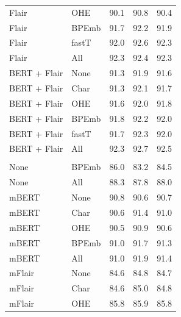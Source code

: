 \documentclass[12pt,a4paper,]{book}
\begin{document}
\begin{longtable}[t]{llrrr}
\hspace{1em}Flair & OHE & 90.1 & 90.8 & 90.4\\
\hspace{1em}Flair & BPEmb & 91.7 & 92.2 & 91.9\\
\hspace{1em}Flair & fastT & 92.0 & 92.6 & 92.3\\
\hspace{1em}Flair & All & 92.3 & 92.4 & 92.3\\
\hspace{1em}BERT + Flair & None & 91.3 & 91.9 & 91.6\\
\hspace{1em}BERT + Flair & Char & 91.3 & 92.1 & 91.7\\
\hspace{1em}BERT + Flair & OHE & 91.6 & 92.0 & 91.8\\
\hspace{1em}BERT + Flair & BPEmb & 91.8 & 92.2 & 92.0\\
\hspace{1em}BERT + Flair & fastT & 91.7 & 92.3 & 92.0\\
\hspace{1em}BERT + Flair & All & 92.3 & 92.7 & 92.5\\
\addlinespace[0.3em]
\multicolumn{5}{l}{\textbf{Multilingual embeddings}}\\
\hspace{1em}None & BPEmb & 86.0 & 83.2 & 84.5\\
\hspace{1em}None & All & 88.3 & 87.8 & 88.0\\
\hspace{1em}mBERT & None & 90.8 & 90.6 & 90.7\\
\hspace{1em}mBERT & Char & 90.6 & 91.4 & 91.0\\
\hspace{1em}mBERT & OHE & 90.5 & 90.9 & 90.6\\
\hspace{1em}mBERT & BPEmb & 91.0 & 91.7 & 91.3\\
\hspace{1em}mBERT & All & 91.0 & 91.9 & 91.4\\
\hspace{1em}mFlair & None & 84.6 & 84.8 & 84.7\\
\hspace{1em}mFlair & Char & 84.6 & 85.0 & 84.8\\
\hspace{1em}mFlair & OHE & 85.8 & 85.9 & 85.8\\

\end{longtable}
\end{document}
